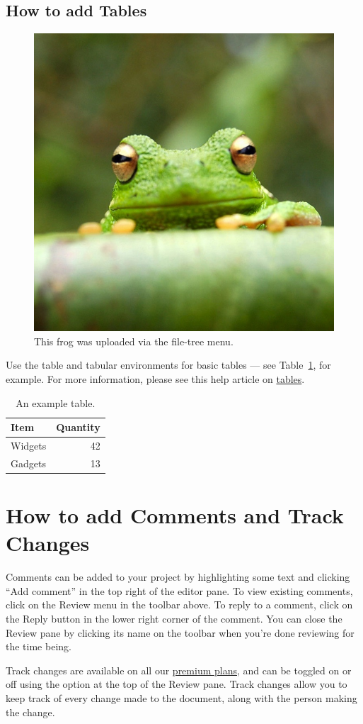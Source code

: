\documentclass[a4paper,12pt]{scrreprt}
\begin{document}
\subsection{How to add Tables}

\begin{figure}
\centering
\includegraphics[width=0.25\linewidth]{frog.jpg}
\caption{\label{fig:frog}This frog was uploaded via the file-tree menu.}
\end{figure}


Use the table and tabular environments for basic tables --- see Table~\ref{tab:widgets}, for example. For more information, please see this help article on \href{https://www.overleaf.com/learn/latex/tables}{tables}. 

\begin{table}
\centering
\begin{tabular}{l|r}
Item & Quantity \\\hline
Widgets & 42 \\
Gadgets & 13
\end{tabular}
\caption{\label{tab:widgets}An example table.}
\end{table}

\section{How to add Comments and Track Changes}

Comments can be added to your project by highlighting some text and clicking ``Add comment'' in the top right of the editor pane. To view existing comments, click on the Review menu in the toolbar above. To reply to a comment, click on the Reply button in the lower right corner of the comment. You can close the Review pane by clicking its name on the toolbar when you're done reviewing for the time being.

Track changes are available on all our \href{https://www.overleaf.com/user/subscription/plans}{premium plans}, and can be toggled on or off using the option at the top of the Review pane. Track changes allow you to keep track of every change made to the document, along with the person making the change. 
\end{document}
